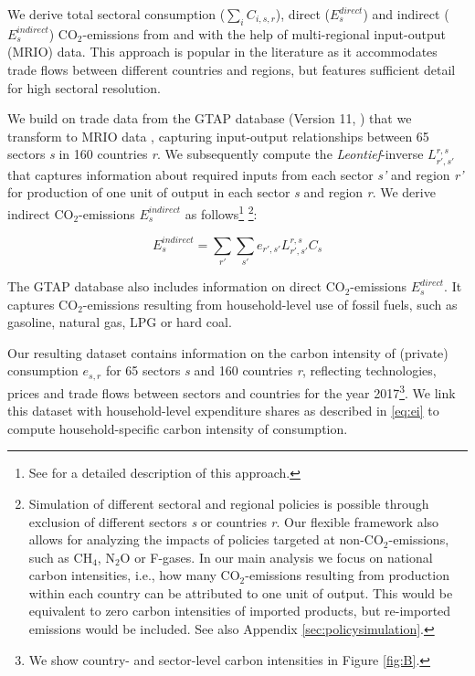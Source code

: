 \documentclass[12pt, a4paper]{article}
\begin{document}
We derive total sectoral consumption ($\sum_{i} C_{i,s,r}$), direct ($E_{s}^{direct}$) and indirect ($E_{s}^{indirect}$) CO$_{2}$-emissions from and with the help of multi-regional input-output (MRIO) data. This approach is popular in the literature as it accommodates trade flows between different countries and regions, but features sufficient detail for high sectoral resolution. 

We build on trade data from the GTAP database (Version 11,  \textcite{Aguiar.2022}) that we transform to MRIO data \autocite{Peters.2011}, capturing input-output relationships between 65 sectors \textit{s} in 160 countries \textit{r}. We subsequently compute the \textit{Leontief}-inverse $L_{r',s'}^{r,s}$ that captures information about required inputs from each sector \textit{s'} and region \textit{r'} for production of one unit of output in each sector \textit{s} and region \textit{r}. We derive indirect CO$_{2}$-emissions $E_{s}^{indirect}$ as follows\footnote{See \textcite{Missbach.2024, Steckel.2021b,Feindt.2021,VogtSchilb.2019} for a detailed description of this approach.} \footnote{Simulation of different sectoral and regional policies is possible through exclusion of different sectors \textit{s} or countries \textit{r}. Our flexible framework also allows for analyzing the impacts of policies targeted at non-CO$_{2}$-emissions, such as CH$_{4}$, N$_{2}$O or F-gases. In our main analysis we focus on national carbon intensities, i.e., how many CO$_{2}$-emissions resulting from production within each country can be attributed to one unit of output. This would be equivalent to zero carbon intensities of imported products, but re-imported emissions would be included. See also Appendix \ref{sec:policysimulation}.}:

\begin{equation}
    E_{s}^{indirect} = \sum_{r'} \sum_{s'} e_{r',s'} L_{r',s'}^{r,s} C_{s}
\end{equation}

The GTAP database also includes information on direct CO$_{2}$-emissions $E_{s}^{direct}$. It captures CO$_{2}$-emissions resulting from household-level use of fossil fuels, such as gasoline, natural gas, LPG or hard coal.

Our resulting dataset contains information on the carbon intensity of (private) consumption $e_{s,r}$ for 65 sectors \textit{s} and 160 countries \textit{r}, reflecting technologies, prices and trade flows between sectors and countries for the year 2017\footnote{We show country- and sector-level carbon intensities in Figure \ref{fig:B}.}. We link this dataset with household-level expenditure shares as described in \ref{eq:ei} to compute household-specific carbon intensity of consumption.
\end{document}

